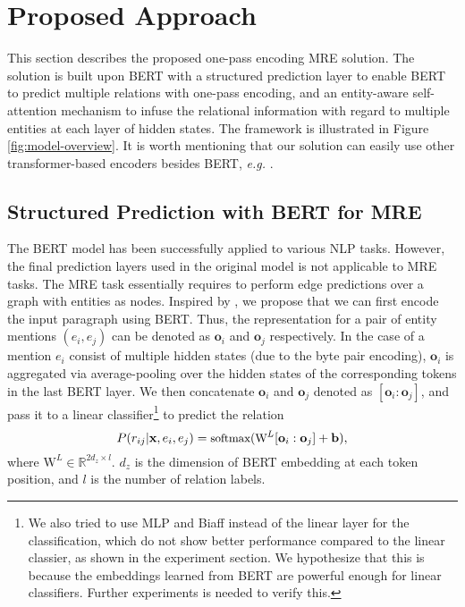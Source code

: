 \documentclass[11pt,a4paper]{article}
\newcommand{\bo}{\mathbf{o}}
\begin{document}
\label{sec:proposed_approach}
\section{Proposed Approach}
This section describes the proposed one-pass encoding MRE solution.
The solution is built upon BERT with a structured prediction layer to enable BERT to predict multiple relations with one-pass encoding, and an entity-aware self-attention mechanism to infuse the relational information with regard to multiple entities at each layer of hidden states.  The framework is illustrated in Figure \ref{fig:model-overview}. It is worth mentioning that our solution can easily use other transformer-based encoders besides BERT, \emph{e.g.} \cite{radford2018improving}.  

\subsection{Structured Prediction with BERT for MRE}
\label{ssec:prediction}
The BERT model has been successfully applied to various NLP tasks. However, the final prediction layers used in the original model is not applicable to MRE tasks.  The MRE task essentially requires to perform edge predictions over a graph with entities as nodes.  Inspired by \cite{dozat2018simpler,ahmad2018near}, we propose that we can first encode the input paragraph using BERT. Thus, the representation for a pair of entity mentions $(e_i, e_j)$  can be denoted as $\bo_i$ and $\bo_j$ respectively. In the case of a mention $e_i$ consist of multiple hidden states (due to the byte pair encoding),  $\bo_i$ is aggregated via average-pooling over the hidden states of the corresponding tokens in the last BERT layer.   We then concatenate $\bo_i$ and $\bo_j$ denoted as $[\bo_i:\bo_j]$, and pass it to a linear classifier\footnote{We also tried to use MLP and Biaff instead of the linear layer for the classification, which do not show better performance compared to the linear classier, as shown in the experiment section. We hypothesize that this is because the embeddings learned from BERT are powerful enough for linear classifiers. Further experiments is needed to verify this.} to predict the relation
\begin{equation}
\small
P(r_{ij}| \mathbf{x}, e_i, e_j)=\textrm{softmax}(\textrm{W}^L[\bo_i:\bo_j] + \mathbf{b}),
\label{pred-layer}
\end{equation}
where $\textrm{W}^L \in \mathbb{R}^{2d_z \times l}$. $d_z$ is the dimension of BERT embedding at each token position, and $l$ is the number of relation labels.
\end{document}
